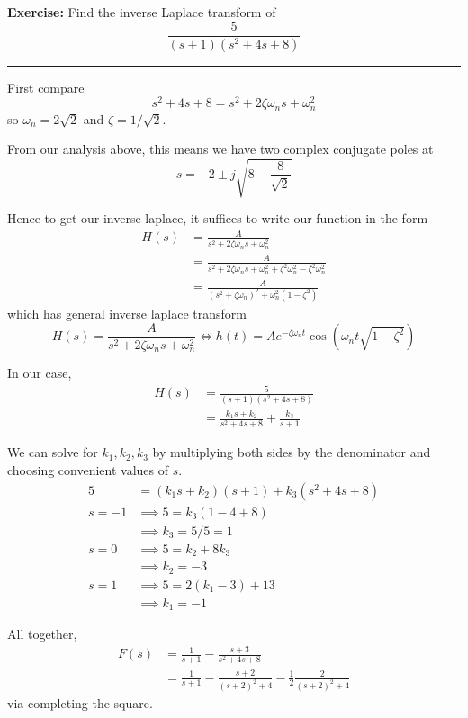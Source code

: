 \documentclass[12pt]{article}
\renewcommand{\div}{\vspace*{10pt}\hrule\vspace*{10pt}}
\newenvironment*{exercise}[1][red]{
    \begin{tcolorbox}[
        parbox=false,
        colback=#1!5!white,
        colframe=#1!75!black,
        breakable
    ]}
    {\end{tcolorbox}}
\begin{document}
\begin{exercise}
    \textbf{Exercise:} Find the inverse Laplace transform of 
    \[\frac{5}{(s+1)(s^2 + 4s + 8)}\]

    \div 

    First compare 
    \[s^2 + 4s + 8 = s^2 + 2\zeta \omega_n s + \omega_n^2\]
    so $\omega_n = 2\sqrt 2 $ and $\zeta = 1/\sqrt 2$. 

    From our analysis above, this means we have two complex conjugate poles at 
    \[s = -2 \pm j  \sqrt{8 - \frac{8}{\sqrt 2}}\]

    Hence to get our inverse laplace, it suffices to write our function in the form 
    \begin{align*}
        H(s) &= \frac{A}{s^2 + 2\zeta \omega_n s + \omega_n^2}\\ 
        &= \frac{A}{s^2 + 2\zeta \omega_n s + \omega_n^2 + \zeta^2 \omega_n^2 - \zeta^2 \omega_n^2}\\
        &= \frac{A}{(s^2 + \zeta \omega_n)^2 + \omega_n^2(1 - \zeta^2)}
    \end{align*}
    which has general inverse laplace transform
    \[ \boxed{H(s) = \frac{A}{s^2 + 2\zeta \omega_n s + \omega_n^2} \iff h(t) = Ae^{-\zeta \omega_n t} \cos(\omega_n t\sqrt{1 - \zeta^2})}\]

    In our case, 
    \begin{align*}
        H(s) &= \frac{5}{(s+1)(s^2 + 4s + 8)}\\ 
        &= \frac{k_1s + k_2}{s^2 + 4s + 8} + \frac{k_3}{s+1} 
    \end{align*}

    We can solve for $k_1, k_2, k_3$ by multiplying both sides by the denominator and choosing convenient values of $s$.
    \begin{align*}
        5 &= (k_1s + k_2)(s+1) + k_3(s^2 + 4s + 8)\\ 
        s = -1 &\implies 5 = k_3(1 - 4 + 8)\\ 
        &\implies k_3 = 5/5 = 1\\
        s = 0 &\implies 5 = k_2 + 8k_3\\ 
        &\implies k_2 = -3\\
        s = 1 &\implies 5 = 2(k_1 -3) + 13\\
        &\implies k_1 = -1
    \end{align*}

    All together, 
    \begin{align*}
        F(s) &= \frac{1}{s+1} - \frac{s+3}{s^2 + 4s + 8}\\ 
        &= \frac{1}{s+1} - \frac{s+2}{(s+2)^2 + 4} - \frac{1}{2}\frac{2}{(s+2)^2 + 4}
    \end{align*}
    via completing the square. 


\end{exercise}
\end{document}
